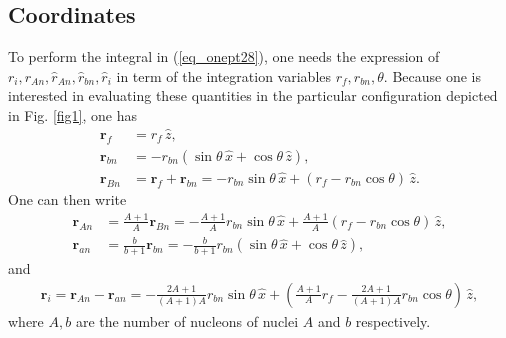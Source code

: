 \subsection{Coordinates}
To perform the integral in (\ref{eq_onept28}), one needs the expression of $r_i,r_{An},\hat r_{An},\hat r_{bn},\hat r_i$ in term of the integration variables $r_f,r_{bn},\theta$. Because one is interested in evaluating these quantities in the particular configuration depicted in Fig. \ref{fig1}, one has
\begin{align}
\mathbf{r}_f&=r_f \,\hat z,\\
\mathbf{r}_{bn}&=-r_{bn}(\sin \theta \,\hat x+ \cos \theta  \,\hat z),\\
\mathbf{r}_{Bn}&=\mathbf{r}_f+\mathbf{r}_{bn}=-r_{bn}\sin \theta \,\hat x+(r_f-r_{bn}\cos \theta)\,\hat z.
\end{align}
One can then write
\begin{align}
\mathbf{r}_{An}&=\frac{A+1}{A}\mathbf{r}_{Bn}=-\frac{A+1}{A}r_{bn}\sin \theta \,\hat x+\frac{A+1}{A}(r_f-r_{bn}\cos \theta)\,\hat z,\\
\mathbf{r}_{an}&=\frac{b}{b+1}\mathbf{r}_{bn}=-\frac{b}{b+1}r_{bn}(\sin \theta \,\hat x+ \cos \theta  \,\hat z),
\end{align}
and
\begin{multline}
\mathbf{r}_i=\mathbf{r}_{An}-\mathbf{r}_{an}=-\frac{2A+1}{(A+1)A}r_{bn}\sin \theta \,\hat x
+\left(\frac{A+1}{A}r_f-\frac{2A+1}{(A+1)A}r_{bn}\cos \theta\right)\,\hat z,
\end{multline}
where $A,b$ are the number of nucleons of nuclei $A$ and $b$ respectively.

